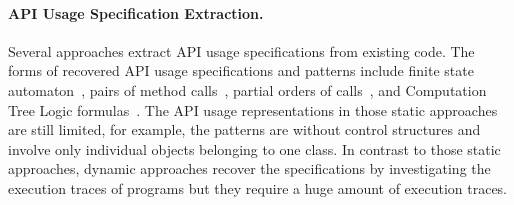 \paragraph{{API Usage Specification Extraction.}} 
Several approaches extract API usage specifications from existing code. The forms of recovered API usage specifications and patterns include finite state automaton~\cite{zeller07,doc2spec}, pairs of method calls~\cite{Livshits2005,williams-tse05}, partial orders of calls~\cite{mapo-fse07,taoxie-ase09}, and Computation Tree Logic formulas~\cite{zeller-ase09}. The API usage representations in those static approaches are still limited, for example, the patterns are without control structures and involve only individual objects belonging to one class. In contrast to those static approaches, dynamic approaches recover the specifications by investigating the execution traces of programs but they require a huge amount of execution traces.  


 
